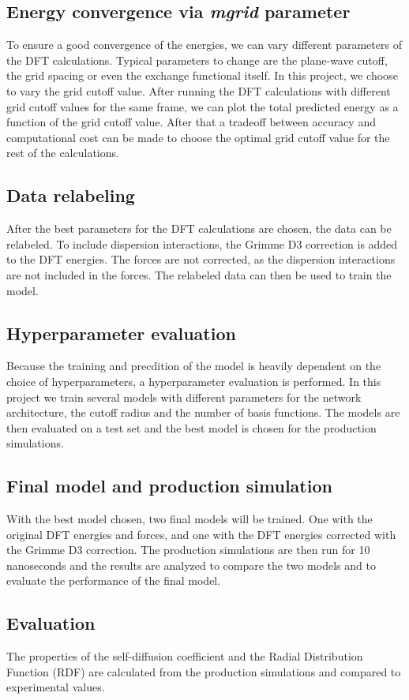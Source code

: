 \subsection{Energy convergence via \textit{mgrid} parameter}
To ensure a good convergence of the energies, we can vary different parameters of the DFT calculations. Typical parameters to change are the plane-wave cutoff, the grid spacing or even the exchange functional itself. In this project, we choose to vary the grid cutoff value. After running the DFT calculations with different grid cutoff values for the same frame, we can plot the total predicted energy as a function of the grid cutoff value. After that a tradeoff between accuracy and computational cost can be made to choose the optimal grid cutoff value for the rest of the calculations.

\subsection{Data relabeling}
After the best parameters for the DFT calculations are chosen, the data can be relabeled. To include dispersion interactions, the Grimme D3 correction is added to the DFT energies. The forces are not corrected, as the dispersion interactions are not included in the forces. The relabeled data can then be used to train the model.

\subsection{Hyperparameter evaluation}
Because the training and precdition of the model is heavily dependent on the choice of hyperparameters, a hyperparameter evaluation is performed. In this project we train several models with different parameters for the network architecture, the cutoff radius and the number of basis functions. The models are then evaluated on a test set and the best model is chosen for the production simulations.

\subsection{Final model and production simulation}
With the best model chosen, two final models will be trained. One with the original DFT energies and forces, and one with the DFT energies corrected with the Grimme D3 correction. The production simulations are then run for 10 nanoseconds and the results are analyzed to compare the two models and to evaluate the performance of the final model.

\subsection{Evaluation}
The properties of the self-diffusion coefficient and the Radial Distribution Function (RDF) are calculated from the production simulations and compared to experimental values.